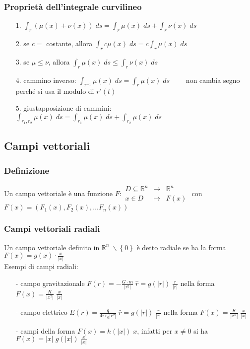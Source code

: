 \documentclass[a4paper]{article}
\newcommand\Rn{\mathbb{R}^n}  %
\begin{document}
\subsubsection*{Proprietà dell'integrale curvilineo}
\begin{itemize}[topsep=3pt, itemsep=0pt]
	\item[1.] \(\displaystyle \int_r (\mu(x) + \nu(x)) \; ds = \int_r \mu(x) \; ds + \int_r \nu(x) \; ds\)
	\item[2.] se \(c =\) costante, allora \(\displaystyle \int_r c\mu(x) \; ds = c \int_r \mu(x) \; ds\)
	\item[3.] se \(\mu \leq \nu\), allora \(\displaystyle \int_r \mu(x) \; ds \leq \int_r \nu(x) \; ds\)
	\item[4.] cammino inverso: \(\displaystyle \int_{r^{-1}} \mu(x) \; ds = \int_r \mu(x) \; ds \qquad\) non cambia segno perché si usa il modulo di \(r'(t)\)
	\item[5.] giustapposizione di cammini: \(\displaystyle \int_{r_1,r_2} \mu(x) \; ds = \int_{r_1} \mu(x) \; ds + \int_{r_2} \mu(x) \; ds\) 
\end{itemize}

\newpage

\subsection{Campi vettoriali}
\subsubsection*{Definizione}
Un campo vettoriale è una funzione \(F : \begin{matrix}
	D \subseteq \Rn & \to & \Rn \\
	x \in D & \mapsto & F(x)
\end{matrix}\) con \(F(x) = (F_1(x), F_2(x), \dots F_n(x))\)

\subsubsection*{Campi vettoriali radiali}
Un campo vettoriale definito in \(\Rn \; \backslash \left\{0\right\}\) è detto radiale se ha la forma \(\displaystyle F(x) = g(x) \cdot \frac{x}{\left|x\right|}\) \\
Esempi di campi radiali:
\begin{itemize}[topsep=3pt, itemsep=0pt]
	\item[-] campo gravitazionale \(\displaystyle F(r) = -\frac{G \cdot m}{\left|r^2\right|} \; \hat{r} = g(\left|r\right|) \; \frac{r}{\left|r\right|}\) nella forma \(\displaystyle F(x) = \frac{K}{\left|x^2\right|} \; \frac{x}{\left|x\right|}\)
	\item[-] campo elettrico \(\displaystyle E(r) = \frac{q}{4 \pi \varepsilon_0 \left|r^2\right|} \; \hat{r} = g(\left|r\right|) \; \frac{r}{\left|r\right|}\) nella forma \(\displaystyle F(x) = \frac{K}{\left|x^2\right|} \; \frac{x}{\left|x\right|}\)
	\item[-] campi della forma \(F(x) = h(\left|x\right|) \; x\), infatti per \(x \neq 0\) si ha \(\displaystyle F(x) = \left|x\right| \; g(\left|x\right|) \; \frac{x}{\left|x\right|}\)
\end{itemize}
\end{document}
